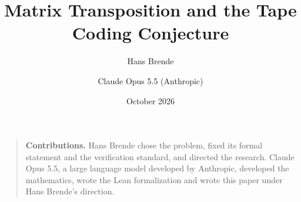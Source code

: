 \documentclass[11pt]{article}
\title{Matrix Transposition and the Tape Coding Conjecture}
\author{Hans Brende \and Claude Opus 5.5 (Anthropic)}
\date{October 2026}
\begin{document}
\maketitle

\begin{abstract}

\end{abstract}

\begin{quote}\small
\textbf{Contributions.} Hans Brende chose the problem, fixed its formal statement and the verification standard, and
directed the research. Claude Opus 5.5, a large language model developed by Anthropic, developed the mathematics, wrote
the Lean formalization and wrote this paper under Hans Brende's direction.
\end{quote}

\tableofcontents
\clearpage
















\appendix





\end{document}
